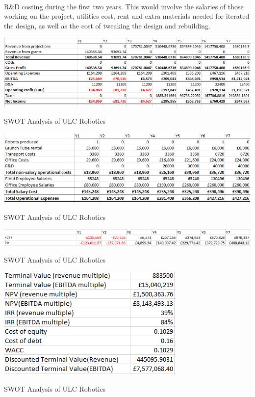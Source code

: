 \documentclass[11pt]{article}		%
\begin{document}
			    \\
			    R\&D costing during the first two years. This would involve the salaries of those working on the project, utilities cost, rent and extra materials needed for iterated the design, as well as the cost of tweaking the design and rebuilding.
			    
		        \begin{table}[h]
					\centering
					\includegraphics[scale=1]{P&L_v1.PNG}
					\caption{SWOT Analysis of ULC Robotics}
					\label{forecast_PL}
				\end{table}
		            
		      	\begin{table}[h]
					\centering
					\includegraphics[scale=1]{costs v1.PNG}
					\caption{SWOT Analysis of ULC Robotics}
					\label{forecast_costs}
				\end{table}
				
		 		\begin{table}[h]
					\centering
					\includegraphics[scale=1]{FCF v1.PNG}
					\caption{SWOT Analysis of ULC Robotics}
					\label{forecast_FCF}
				\end{table}
				
				\begin{table}[h]
					\centering
					\includegraphics[scale=1]{IRR v1.PNG}
					\caption{SWOT Analysis of ULC Robotics}
					\label{forecast_IRR}
				\end{table}
	        
\end{document}
